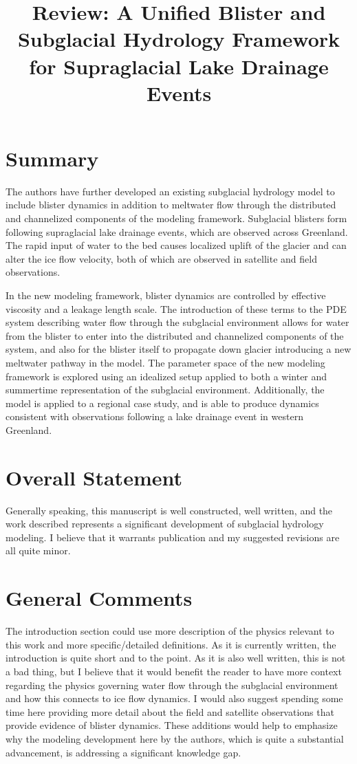 \documentclass[11pt]{article}
\title{Review: A Unified Blister and Subglacial Hydrology Framework for Supraglacial Lake Drainage Events}
\author{}
\date{}
\begin{document}
\maketitle

\section*{Summary}

The authors have further developed an existing subglacial hydrology model to include blister
dynamics in addition to meltwater flow through the distributed and channelized components of
the modeling framework. Subglacial blisters form following supraglacial lake drainage events,
which are observed across Greenland. The rapid input of water to the bed causes localized uplift
of the glacier and can alter the ice flow velocity, both of which are observed in satellite and field
observations.

In the new modeling framework, blister dynamics are controlled by effective viscosity and a
leakage length scale. The introduction of these terms to the PDE system describing water flow
through the subglacial environment allows for water from the blister to enter into the distributed
and channelized components of the system, and also for the blister itself to propagate down
glacier introducing a new meltwater pathway in the model. The parameter space of the new
modeling framework is explored using an idealized setup applied to both a winter and
summertime representation of the subglacial environment. Additionally, the model is applied to a
regional case study, and is able to produce dynamics consistent with observations following a
lake drainage event in western Greenland.

\section*{Overall Statement}

Generally speaking, this manuscript is well constructed, well written, and the work described
represents a significant development of subglacial hydrology modeling. I believe that it warrants
publication and my suggested revisions are all quite minor.

\section*{General Comments}

The introduction section could use more description of the physics relevant to this work and
more specific/detailed definitions. As it is currently written, the introduction is quite short and to
the point. As it is also well written, this is not a bad thing, but I believe that it would benefit the
reader to have more context regarding the physics governing water flow through the subglacial
environment and how this connects to ice flow dynamics. I would also suggest spending some
time here providing more detail about the field and satellite observations that provide evidence of
blister dynamics. These additions would help to emphasize why the modeling development here
by the authors, which is quite a substantial advancement, is addressing a significant knowledge
gap.
\end{document}
